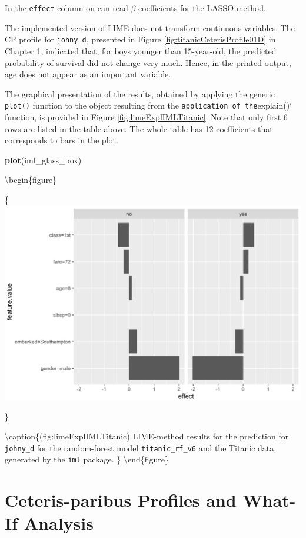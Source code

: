 \documentclass[12pt,]{krantz}
\newenvironment{Shaded}{\begin{snugshade}}{\end{snugshade}}
\newcommand{\KeywordTok}[1]{\textcolor[rgb]{0.13,0.29,0.53}{\textbf{#1}}}
\newcommand{\NormalTok}[1]{#1}
\begin{document}
In the \texttt{effect} column on can read \(\beta\) coefficients for the LASSO method.

The implemented version of LIME does not transform continuous variables. The CP profile for \texttt{johny\_d}, presented in Figure \ref{fig:titanicCeterisProfile01D} in Chapter \ref{ceterisParibus}, indicated that, for boys younger than 15-year-old, the predicted probability of survival did not change very much. Hence, in the printed output, age does not appear as an important variable.

The graphical presentation of the results, obtained by applying the generic \texttt{plot()} function to the object resulting from the \texttt{application\ of\ the}explain()` function, is provided in Figure \ref{fig:limeExplIMLTitanic}. Note that only first 6 rows are listed in the table above. The whole table has 12 coefficients that corresponds to bars in the plot.

\begin{Shaded}
\begin{Highlighting}[]
\KeywordTok{plot}\NormalTok{(iml_glass_box) }
\end{Highlighting}
\end{Shaded}

\textbackslash{}begin\{figure\}

\{\centering \includegraphics[width=0.6\linewidth]{figure/lime_expl_iml_titanic}

\}

\textbackslash{}caption\{(fig:limeExplIMLTitanic) LIME-method results for the prediction for \texttt{johny\_d} for the random-forest model \texttt{titanic\_rf\_v6} and the Titanic data, generated by the \texttt{iml} package. \}\label{fig:limeExplIMLTitanic}
\textbackslash{}end\{figure\}

\hypertarget{ceterisParibus}{%
\section{Ceteris-paribus Profiles and What-If Analysis}\label{ceterisParibus}}
\end{document}
